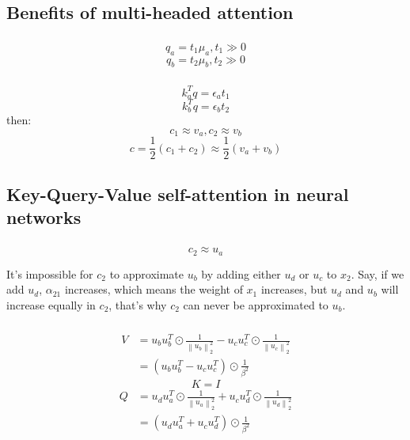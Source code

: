 \documentclass{homework}
\begin{document}
\subsection{Benefits of multi-headed attention}
\subsubsection{}
$$q_a = t_{1} \mu_{a}, t_{1}\gg 0$$
$$q_b = t_{2} \mu_{b}, t_{2}\gg 0$$

\subsubsection{}
$$k_a^Tq=\epsilon_a t_1$$
$$k_b^Tq=\epsilon_b t_2$$
then:
$$c_1 \approx v_a, c_2 \approx v_b$$
$$
c = \frac{1}{2}\left(c_{1}+c_{2}\right) \approx \frac{1}{2}\left(v_{a}+v_{b}\right)
$$

\subsection{Key-Query-Value self-attention in neural networks}
\subsubsection{}
$$c_2\approx u_a$$

It's impossible for $c_2$ to approximate $u_b$ by adding either $u_d$ or $u_c$ to $x_2$. Say, if we add $u_d$, $\alpha_{21}$ increases, which means the weight of $x_1$ increases, but $u_d$ and $u_b$ will increase equally in $c_2$, that's why $c_2$ can never be approximated to $u_b$.

\subsubsection{}
$$
\begin{aligned}
V &=u_{b} u_{b}^{T} \odot \frac{1}{\left\|u_{b}\right\|_{2}^{2}}-u_{c} u_{c}^{T} \odot \frac{1}{\left\|u_{c}\right\|_{2}^{2}} \\
&=\left(u_{b} u_{b}^{T}-u_{c} u_{c}^{T}\right) \odot \frac{1}{\beta^{2}}
\end{aligned}
$$
$$K=I$$
$$
\begin{aligned}
Q &=u_{d} u_{a}^{T} \odot \frac{1}{\left\|u_{a}\right\|_{2}^{2}}+u_{c} u_{d}^{T} \odot \frac{1}{\left\|u_{d}\right\|_{2}^{2}} \\
&=\left(u_{d} u_{a}^{T}+u_{c} u_{d}^{T}\right) \odot \frac{1}{\beta^{2}}
\end{aligned}
$$
\end{document}
